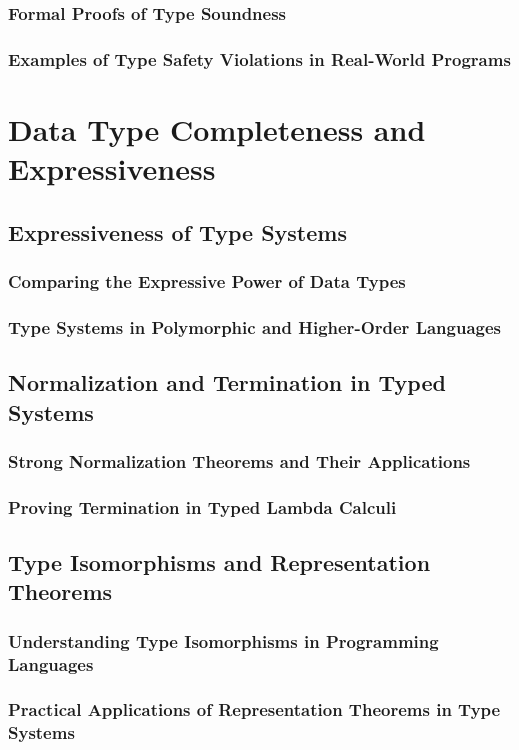 \documentclass[12pt, oneside]{book}
\begin{document}
\subsubsection{Formal Proofs of Type Soundness}
\subsubsection{Examples of Type Safety Violations in Real-World Programs}

\section{Data Type Completeness and Expressiveness}
\subsection{Expressiveness of Type Systems}
\subsubsection{Comparing the Expressive Power of Data Types}
\subsubsection{Type Systems in Polymorphic and Higher-Order Languages}
\subsection{Normalization and Termination in Typed Systems}
\subsubsection{Strong Normalization Theorems and Their Applications}
\subsubsection{Proving Termination in Typed Lambda Calculi}
\subsection{Type Isomorphisms and Representation Theorems}
\subsubsection{Understanding Type Isomorphisms in Programming Languages}
\subsubsection{Practical Applications of Representation Theorems in Type Systems}
\end{document}
